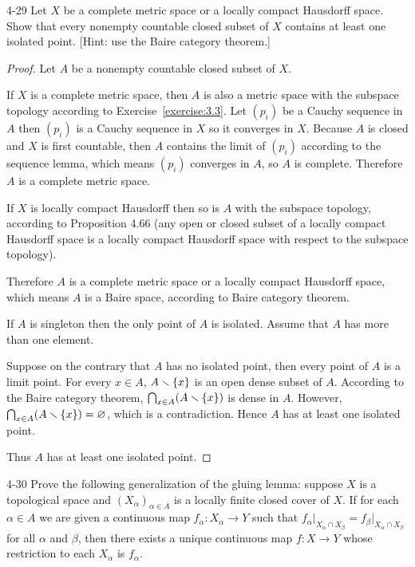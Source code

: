 \begin{problem}{4-29}
Let $X$ be a complete metric space or a locally compact Hausdorff space. Show that every nonempty countable closed subset of $X$ contains at least one isolated point. [Hint: use the Baire category theorem.]
\end{problem}

\begin{proof}
	Let $A$ be a nonempty countable closed subset of $X$.

	If $X$ is a complete metric space, then $A$ is also a metric space with the subspace topology according to Exercise~\ref{exercise:3.3}. Let ${(p_{i})}$ be a Cauchy sequence in $A$ then ${(p_{i})}$ is a Cauchy sequence in $X$ so it converges in $X$. Because $A$ is closed and $X$ is first countable, then $A$ contains the limit of ${(p_{i})}$ according to the sequence lemma, which means ${(p_{i})}$ converges in $A$, so $A$ is complete. Therefore $A$ is a complete metric space.

	If $X$ is locally compact Hausdorff then so is $A$ with the subspace topology, according to Proposition 4.66 (any open or closed subset of a locally compact Hausdorff space is a locally compact Hausdorff space with respect to the subspace topology).

	Therefore $A$ is a complete metric space or a locally compact Hausdorff space, which means $A$ is a Baire space, according to Baire category theorem.

	If $A$ is singleton then the only point of $A$ is isolated. Assume that $A$ has more than one element.

	Suppose on the contrary that $A$ has no isolated point, then every point of $A$ is a limit point. For every $x\in A$, $A\smallsetminus \left\{{x}\right\}$ is an open dense subset of $A$. According to the Baire category theorem, $\bigcap_{x\in A}(A\smallsetminus \left\{{x}\right\})$ is dense in $A$. However, $\bigcap_{x\in A}(A\smallsetminus \left\{{x}\right\}) = \varnothing$, which is a contradiction. Hence $A$ has at least one isolated point.

	Thus $A$ has at least one isolated point.
\end{proof}

\begin{problem}{4-30}
Prove the following generalization of the gluing lemma: suppose $X$ is a topological space and ${(X_{\alpha})}_{\alpha\in A}$ is a locally finite closed cover of $X$. If for each $\alpha\in A$ we are given a continuous map $f_{\alpha}: X_{\alpha} \to Y$ such that $f_{\alpha}\vert_{X_{\alpha}\cap X_{\beta}} = f_{\beta}\vert_{X_{\alpha}\cap X_{\beta}}$ for all $\alpha$ and $\beta$, then there exists a unique continuous map $f: X\to Y$ whose restriction to each $X_{\alpha}$ is $f_{\alpha}$.
\end{problem}

